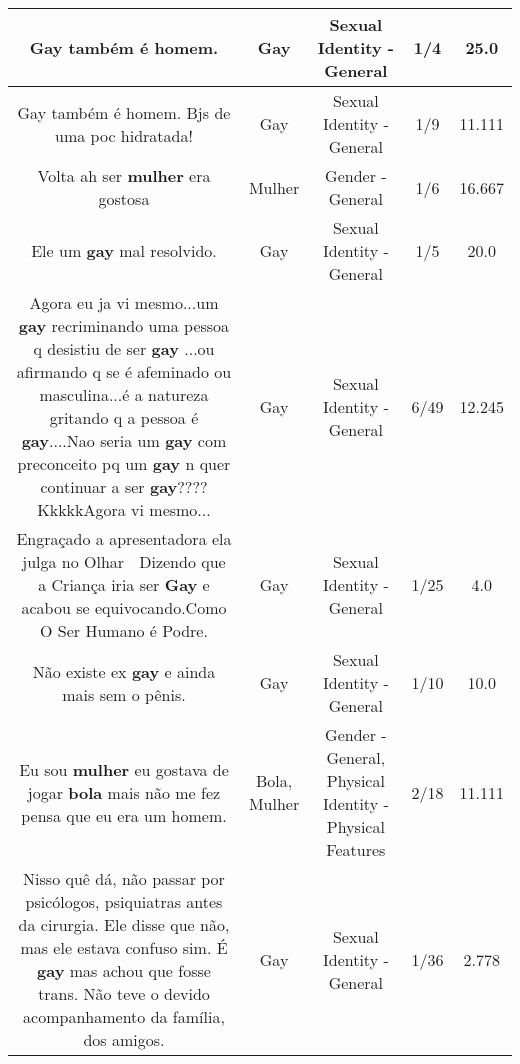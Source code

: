\documentclass[11pt]{article}
\newlength\mylength
\begin{document}
\begin{center}
\begin{longtable}{|C{.65\mylength}|C{.30\mylength}|C{.12\mylength}|C{.12\mylength}|C{.12\mylength}|}
  \small Gay também é homem.\normalsize   & Gay & Sexual Identity - General & 1/4 & 25.0 \\  \hline
  \small Gay também é homem. Bjs de uma poc  hidratada!\normalsize   & Gay & Sexual Identity - General & 1/9 & 11.111 \\  \hline
  \small Volta ah ser \textbf{mulher} era gostosa\normalsize   & Mulher & Gender - General & 1/6 & 16.667 \\  \hline
  \small Ele um \textbf{gay} mal resolvido.\normalsize   & Gay & Sexual Identity - General & 1/5 & 20.0 \\  \hline
  \small Agora eu ja vi mesmo...um \textbf{gay} recriminando uma pessoa q desistiu de ser \textbf{gay} ...ou afirmando q se é afeminado ou masculina...é a natureza gritando q a pessoa é \textbf{gay}....Nao seria um \textbf{gay} com preconceito  pq um \textbf{gay} n quer continuar a ser \textbf{gay}????KkkkkAgora vi mesmo...\normalsize   & Gay & Sexual Identity - General & 6/49 & 12.245 \\  \hline
  \small Engraçado a apresentadora ela julga no Olhar 👀 Dizendo que a Criança iria ser \textbf{Gay} e acabou se equivocando.Como O Ser Humano é Podre.\normalsize   & Gay & Sexual Identity - General & 1/25 & 4.0 \\  \hline
  \small Não existe ex \textbf{gay} e ainda mais sem o pênis.\normalsize   & Gay & Sexual Identity - General & 1/10 & 10.0 \\  \hline
  \small Eu sou \textbf{mulher} eu gostava de jogar \textbf{bola} mais não me fez pensa que eu era um homem.\normalsize   & Bola, Mulher & Gender - General, Physical Identity - Physical Features & 2/18 & 11.111 \\  \hline
  \small Nisso quê dá, não passar por psicólogos, psiquiatras antes da cirurgia. Ele disse que não, mas ele estava confuso sim. É \textbf{gay} mas achou que fosse trans. Não teve o devido acompanhamento da família, dos amigos.\normalsize   & Gay & Sexual Identity - General & 1/36 & 2.778 \\  \hline

\end{longtable}
\end{center}
\end{document}
